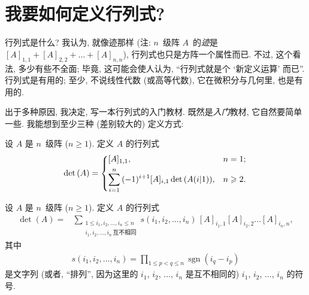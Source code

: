 \section{我要如何定义行列式?}

行列式是什么?
我认为,
就像迹那样
(注: \(n\)~级阵 \(A\)~的\emph{迹}是
\([A]_{1,1} + [A]_{2,2} + \dots + [A]_{n,n}\)),
行列式也只是方阵一个属性而已.
不过, 这个看法, 多少有些不全面;
毕竟, 这可能会使人认为,
``行列式就是个 `新定义运算' 而已''.
行列式是有用的;
至少, 不说线性代数 (或高等代数),
它在微积分与几何里, 也是有用的.

出于多种原因, 我决定,
写一本行列式的入门教材.
既然是\emph{入门}教材,
它自然要简单一些.
我能想到至少三种 (差别较大的) 定义方式:

\begin{definition}[归纳定义]
    设 \(A\) 是 \(n\)~级阵 (\(n \geq 1\)).
    定义 \(A\) 的行列式
    \begin{align*}
        \det {(A)}
        =
        \begin{dcases}
            [A]_{1,1},
             & n = 1;    \\
            \sum_{i = 1}^{n}
            {(-1)^{i+1} [A]_{i,1} \det {(A(i|1))}},
             & n \geq 2.
        \end{dcases}
    \end{align*}
\end{definition}

\begin{definition}[组合定义]
    设 \(A\) 是 \(n\)~级阵 (\(n \geq 1\)).
    定义 \(A\) 的行列式
    \begin{align*}
        \det {(A)}
        = {} &
        \sum_{\substack{
        1 \leq i_1, i_2, \dots, i_n \leq n \\
                i_1, i_2, \dots, i_n\,\text{互不相同}
            }}
        {s(i_1, i_2, \dots, i_n)\,
            [A]_{i_1,1} [A]_{i_2,2} \dots [A]_{i_n,n}},
    \end{align*}
    其中
    \begin{align*}
        s(i_1, i_2, \dots, i_n)
        = \prod_{1 \leq p < q \leq n}
        {\operatorname{sgn} {(i_q - i_p)}}
    \end{align*}
    是文字列
    (或者, ``排列'',
    因为这里的 \(i_1\), \(i_2\), \(\dots\), \(i_n\)
    是互不相同的)
    \(i_1\), \(i_2\), \(\dots\), \(i_n\) 的符号.
\end{definition}

